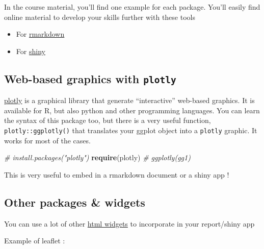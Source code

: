 \documentclass[
]{book}
\newenvironment{Shaded}{\begin{snugshade}}{\end{snugshade}}
\newcommand{\CommentTok}[1]{\textcolor[rgb]{0.56,0.35,0.01}{\textit{#1}}}
\newcommand{\KeywordTok}[1]{\textcolor[rgb]{0.13,0.29,0.53}{\textbf{#1}}}
\newcommand{\NormalTok}[1]{#1}
\providecommand{\tightlist}{%
  \setlength{\itemsep}{0pt}\setlength{\parskip}{0pt}}
\begin{document}
In the course material, you'll find one example for each package. You'll easily find online material to develop your skills further with these tools

\begin{itemize}
\tightlist
\item
  For \href{https://bookdown.org/yihui/rmarkdown/}{rmarkdown}
\item
  For \href{https://mastering-shiny.org/}{shiny}
\end{itemize}

\hypertarget{web-based-graphics-with-plotly}{%
\subsection{\texorpdfstring{Web-based graphics with \texttt{plotly}}{Web-based graphics with plotly}}\label{web-based-graphics-with-plotly}}

\href{https://plotly.com/r/}{plotly} is a graphical library that generate ``interactive'' web-based graphics. It is available for R, but also python and other programming languages. You can learn the syntax of this package too, but there is a very useful function, \texttt{plotly::ggplotly()} that translates your ggplot object into a \texttt{plotly} graphic. It works for most of the cases.

\begin{Shaded}
\begin{Highlighting}[]
\CommentTok{# install.packages("plotly")}
\KeywordTok{require}\NormalTok{(plotly)}
\CommentTok{# ggplotly(gg1)}
\end{Highlighting}
\end{Shaded}

This is very useful to embed in a rmarkdown document or a shiny app !

\hypertarget{other-packages-widgets}{%
\subsection{Other packages \& widgets}\label{other-packages-widgets}}

You can use a lot of other \href{https://www.htmlwidgets.org/index.html}{html widgets} to incorporate in your report/shiny app

Example of leaflet :

\begin{Shaded}
\end{Shaded}
\end{document}
